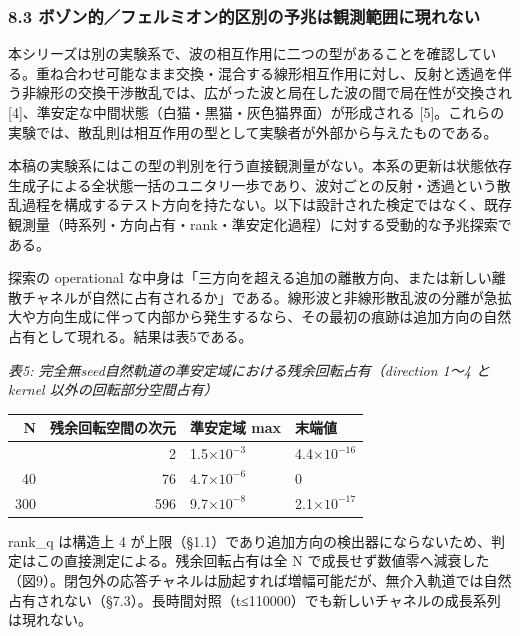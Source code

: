 \documentclass[
  a4paper,
]{ltjsarticle}
\newcounter{none} %
\begin{document}
\subsubsection{8.3
ボゾン的／フェルミオン的区別の予兆は観測範囲に現れない}\label{ux30dcux30beux30f3ux7684ux30d5ux30a7ux30ebux30dfux30aaux30f3ux7684ux533aux5225ux306eux4e88ux5146ux306fux89b3ux6e2cux7bc4ux56f2ux306bux73feux308cux306aux3044}

本シリーズは別の実験系で、波の相互作用に二つの型があることを確認している。重ね合わせ可能なまま交換・混合する線形相互作用に対し、反射と透過を伴う非線形の交換干渉散乱では、広がった波と局在した波の間で局在性が交換され
{[}4{]}、準安定な中間状態（白猫・黒猫・灰色猫界面）が形成される
{[}5{]}。これらの実験では、散乱則は相互作用の型として実験者が外部から与えたものである。

本稿の実験系にはこの型の判別を行う直接観測量がない。本系の更新は状態依存生成子による全状態一括のユニタリ一歩であり、波対ごとの反射・透過という散乱過程を構成するテスト方向を持たない。以下は設計された検定ではなく、既存観測量（時系列・方向占有・rank・準安定化過程）に対する受動的な予兆探索である。

探索の operational
な中身は「三方向を超える追加の離散方向、または新しい離散チャネルが自然に占有されるか」である。線形波と非線形散乱波の分離が急拡大や方向生成に伴って内部から発生するなら、その最初の痕跡は追加方向の自然占有として現れる。結果は表5である。

\emph{表5: 完全無seed自然軌道の準安定域における残余回転占有（direction
1〜4 と kernel 以外の回転部分空間占有）}

{\def\LTcaptype{none} %
\begin{longtable}[]{@{}rrll@{}}
\toprule\noalign{}
N & 残余回転空間の次元 & 準安定域 max & 末端値 \\
\midrule\noalign{}
\endhead
\bottomrule\noalign{}
\endlastfoot
5 & 2 & 1.5\(\times10^{-3}\) & 4.4\(\times10^{-16}\) \\
40 & 76 & 4.7\(\times10^{-6}\) & 0 \\
300 & 596 & 9.7\(\times10^{-8}\) & 2.1\(\times10^{-17}\) \\
\end{longtable}
}

rank\_q は構造上 4
が上限（§1.1）であり追加方向の検出器にならないため、判定はこの直接測定による。残余回転占有は全
N
で成長せず数値零へ減衰した（図9）。閉包外の応答チャネルは励起すれば増幅可能だが、無介入軌道では自然占有されない（§7.3）。長時間対照（t≤110000）でも新しいチャネルの成長系列は現れない。
\end{document}
